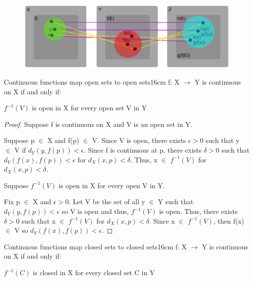     \begin{figure}[h]
        \centering
        \includegraphics[scale=0.37]{Images/11.2.3.png}
    \end{figure}

    \newpage



    \begin{wtheorem}{Continuous functions map open sets to open sets}{16cm}
        f: X $\rightarrow$ Y is continuous on X if and only if:

        \hspace{0.5cm}
        $f^{-1}(V)$ is open in X for every open set V in Y
    \end{wtheorem}

    \begin{proof}
        Suppose f is continuous on X and V is an open set in Y.

        Suppose p $\in$ X and f(p) $\in$ V.
        Since V is open, there exists $\epsilon > 0$ such that
        y $\in$ V if $d_Y(y,f(p)) < \epsilon$.
        Since f is continuous at p, there exists $\delta > 0$ such that
        $d_Y(f(x),f(p)) < \epsilon$ for $d_X(x,p) < \delta$.
        Thus, x $\in$ $f^{-1}(V)$ for $d_X(x,p) < \delta$.

        \vspace{0.2cm}

        Suppose $f^{-1}(V)$ is open in X for every open V in Y.

        Fix p $\in$ X and $\epsilon > 0$.
        Let V be the set of all y $\in$ Y such that $d_Y(y,f(p)) < \epsilon$
        so V is open and thus, $f^{-1}(V)$ is open.
        Thus, there exists $\delta > 0$ such that x $\in$ $f^{-1}(V)$
        for $d_X(x,p) < \delta$.
        Since x $\in$ $f^{-1}(V)$, then f(x) $\in$ V
        so $d_Y(f(x),f(p)) < \epsilon$.
    \end{proof}

    \vspace{0.5cm}



    \begin{corollary}{Continuous functions map closed sets to closed sets}{16cm}
        f: X $\rightarrow$ Y is continuous on X if and only if:

        \hspace{0.5cm}
        $f^{-1}(C)$ is closed in X for every closed set C in Y   
    \end{corollary}

